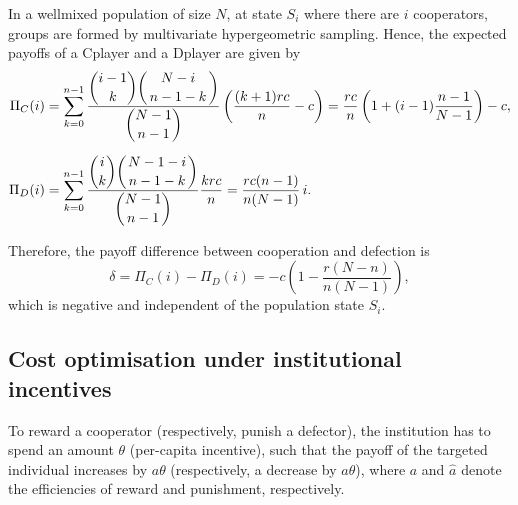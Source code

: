 \documentclass{article}
\begin{document}
\noindent In a well\text{-}mixed population of size $N$, at state $S_i$ where there are $i$ cooperators, groups are formed by multivariate hypergeometric sampling. Hence, the expected payoffs of a C\text{-}player and a D\text{-}player are given by
\begin{equation*}
\begin{aligned}
\Pi_C(i)
&= \sum^{n-1}_{k=0}
\frac{\dbinom{i-1}{k}\dbinom{N-i}{\,n-1-k\,}}{\dbinom{N-1}{\,n-1\,}}
\left(\frac{(k+1)rc}{n} - c \right)
= \frac{rc}{n}\left(1 + (i-1)\frac{n-1}{N-1}\right) - c, \\[6pt]
\Pi_D(i)
&= \sum^{n-1}_{k=0}
\frac{\dbinom{i}{k}\dbinom{N-1-i}{\,n-1-k\,}}{\dbinom{N-1}{\,n-1\,}}
\frac{krc}{n}
= \frac{rc(n-1)}{n(N-1)}\, i .
\end{aligned}
\end{equation*}

\noindent Therefore, the payoff difference between cooperation and defection is
\[
\delta = \Pi_C(i) - \Pi_D(i)
= -c \left(1 - \frac{r(N-n)}{n(N-1)} \right),
\]
which is negative and independent of the population state $S_i$.

\subsection{Cost optimisation under institutional incentives}

To reward a cooperator (respectively, punish a defector), the institution has to spend an amount $\theta$ (per-capita incentive), such that the payoff of the targeted individual increases  by $a \theta$ (respectively, a decrease by $\hat{a} \theta $), where $a$ and $\hat{a}$ denote the efficiencies of reward and punishment, respectively.


\end{document}
